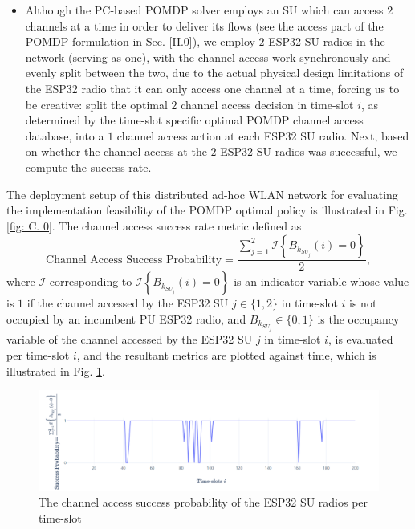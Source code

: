 \documentclass[12pt, draftcls, onecolumn]{IEEEtran}
\begin{document}
\begin{itemize}
    \item Although the PC-based POMDP solver employs an SU which can access $2$ channels at a time in order to deliver its flows (see the access part of the POMDP formulation in Sec. \ref{II.0}), we employ $2$ ESP32 SU radios in the network (serving as one), with the channel access work synchronously and evenly split between the two, due to the actual physical design limitations of the ESP32 radio that it can only access one channel at a time, forcing us to be creative: split the optimal $2$ channel access decision in time-slot $i$, as determined by the time-slot specific optimal POMDP channel access database, into a $1$ channel access action at each ESP32 SU radio. Next, based on whether the channel access at the $2$ ESP32 SU radios was successful, we compute the success rate.
\end{itemize}
The deployment setup of this distributed ad-hoc WLAN network for evaluating the implementation feasibility of the POMDP optimal policy is illustrated in Fig. \ref{fig: C. 0}. The channel access success rate metric defined as
\begin{equation}\label{C.I}
    \text{Channel Access Success Probability}=\frac{\sum_{j=1}^{2}\mathcal{I}\left\{B_{k_{SU_{j}}}(i)=0\right\}}{2},
\end{equation}
where $\mathcal{I}$ corresponding to $\mathcal{I}\left\{B_{k_{SU_{j}}}(i)=0\right\}$ is an indicator variable whose value is $1$ if the channel accessed by the ESP32 SU $j{\in}\{1,2\}$ in time-slot $i$ is not occupied by an incumbent PU ESP32 radio, and $B_{k_{SU_{j}}}{\in}\{0,1\}$ is the occupancy variable of the channel accessed by the ESP32 SU $j$ in time-slot $i$, is evaluated per time-slot $i$, and the resultant metrics are plotted against time, which is illustrated in Fig. \ref{fig:C.1}.
\begin{figure} [htb]
    \centerline{
    \includegraphics[width = 0.8\linewidth]{figures/ESP32_Success_Probability.PNG}}
    \caption{The channel access success probability of the ESP32 SU radios per time-slot}
    \label{fig:C.1}
\end{figure}
\end{document}
